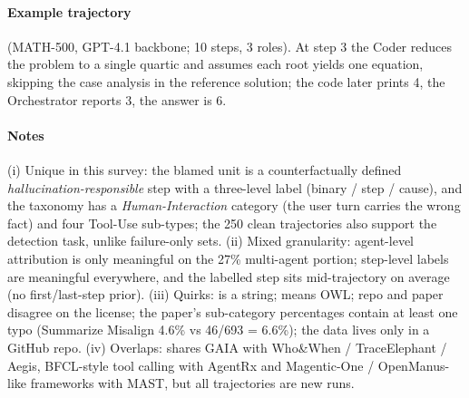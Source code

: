 \paragraph{Example trajectory}  (MATH-500, GPT-4.1 backbone; 10 steps, 3 roles). At step 3 the Coder reduces the problem to a single quartic and assumes each root yields one equation, skipping the case analysis in the reference solution; the code later prints 4, the Orchestrator reports 3, the answer is 6.


\paragraph{Notes} (i) Unique in this survey: the blamed unit is a counterfactually defined \emph{hallucination-responsible} step with a three-level label (binary / step / cause), and the taxonomy has a \emph{Human-Interaction} category (the user turn carries the wrong fact) and four Tool-Use sub-types; the 250 clean trajectories also support the detection task, unlike failure-only sets. (ii) Mixed granularity: agent-level attribution is only meaningful on the 27\% multi-agent portion; step-level labels are meaningful everywhere, and the labelled step sits mid-trajectory on average (no first/last-step prior). (iii) Quirks:  is a string;  means OWL; repo and paper disagree on the license; the paper's sub-category percentages contain at least one typo (Summarize Misalign 4.6\% vs 46/693 = 6.6\%); the data lives only in a GitHub repo. (iv) Overlaps: shares GAIA with Who\&When / TraceElephant / Aegis, BFCL-style tool calling with AgentRx and Magentic-One / OpenManus-like frameworks with MAST, but all trajectories are new runs.
